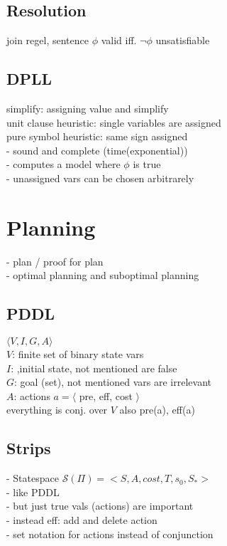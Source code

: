 \subsection*{Resolution}
join regel, sentence $\phi$ valid iff. $\neg\phi$ unsatisfiable 

\subsection*{DPLL}
simplify: assigning value and simplify \\
unit clause heuristic: single variables are assigned\\
pure symbol heuristic:  same sign assigned\\
- sound and complete (time(exponential))\\
- computes a model where $\phi$ is true\\
- unassigned vars can be chosen arbitrarely

\section*{Planning}
- plan / proof for plan \\ 
-  optimal planning and suboptimal planning

\subsection*{PDDL}
$\langle V, I, G, A \rangle$ \\
$V$: finite set of binary state vars\\
$I$: ,initial state, not mentioned are false\\
$G$:  goal (set), not mentioned vars are irrelevant\\
$A$: actions $a = \langle$ pre, eff, cost $\rangle$ \\
everything is conj. over $V$ also pre(a), eff(a)

\subsection*{Strips}
- Statespace $\mathcal{S}(\Pi) = <S, A, cost, T, s_0, S_*>$ \\
- like PDDL \\ 
- but just true vals (actions) are important \\ 
- instead eff: add and delete action \\
- set notation for actions instead of conjunction

